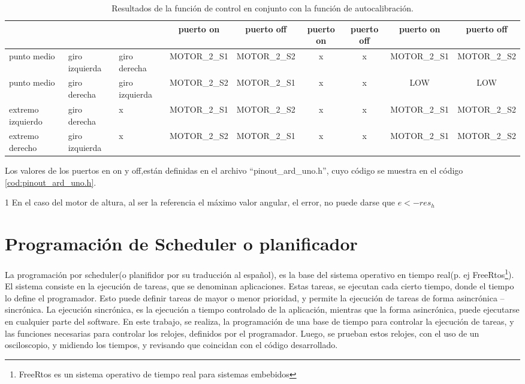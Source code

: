 \begin{table}[ht]
{\begin{threeparttable}
\begin{tabular}{|p{1.5cm}|p{1.5cm}|p{1.5cm}|c|c|c|c|c|c|}
		& &  & puerto on & puerto off &puerto on & puerto off&puerto on & puerto off\\ 
		\hline 
		punto medio & giro izquierda & giro derecha &  MOTOR\_2\_S1 &  MOTOR\_2\_S2  & x & x &MOTOR\_2\_S1 &MOTOR\_2\_S2 \\ 
		\hline 
		punto medio & giro derecha & giro izquierda & MOTOR\_2\_S2 & MOTOR\_2\_S1 & x & x & LOW &LOW \\ 
		\hline  
		extremo izquierdo & giro derecha &x & MOTOR\_2\_S1 & MOTOR\_2\_S2  &   x  & x  &MOTOR\_2\_S1 &MOTOR\_2\_S2 \\ 
		\hline 
		extremo derecho & giro izquierda & x & MOTOR\_2\_S2 & MOTOR\_2\_S1  & x  & x  &MOTOR\_2\_S1 &MOTOR\_2\_S2 \\ 
		\hline 
	\end{tabular}
	\begin{tablenotes}
	 	\small 
	 	\item Los valores de los puertos en on y off,están definidas en el archivo ``pinout\_ard\_uno.h'', cuyo código se muestra en el código  \ref{cod:pinout_ard_uno.h}.
	 	
	 	\item [1] En el caso del motor de altura, al ser la referencia el máximo valor angular, el error, no puede darse que $e < -res_h $  
	\end{tablenotes}
	\end{threeparttable}
}	
	\caption{Resultados de la función de control en conjunto con la función de autocalibración.}
	\label{tab:result_control}
\end{table}


\section{Programación de Scheduler o planificador}

La programación por scheduler(o planifidor por su traducción al español), es la base del sistema operativo en tiempo real(p. ej FreeRtos\footnote{FreeRtos es un sistema operativo de tiempo real para sistemas embebidos}). El sistema consiste en la ejecución de tareas, que se denominan aplicaciones. Estas tareas, se ejecutan cada cierto tiempo, donde el tiempo lo define el programador. Esto puede definir tareas de mayor o menor prioridad, y permite la ejecución de tareas de forma asincrónica – sincrónica. La ejecución sincrónica, es la ejecución a tiempo controlado de la aplicación, mientras que la forma asincrónica, puede ejecutarse en cualquier parte del software. En este trabajo, se realiza, la programación de una base de tiempo para controlar la ejecución de tareas, y las funciones necesarias para controlar los relojes, definidos por el programador. Luego, se prueban estos relojes, con el uso de un osciloscopio, y midiendo los tiempos, y revisando que coincidan con el código desarrollado. 

